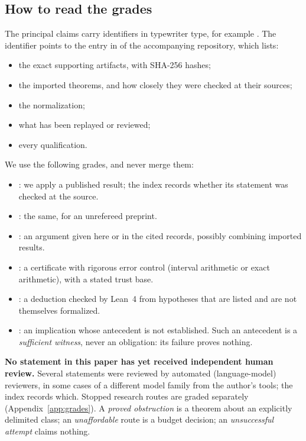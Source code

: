 \subsection{How to read the grades}\label{subsec:grades}
The principal claims carry identifiers in typewriter type, for example . The identifier points to the entry in  of the accompanying repository, which lists:
\begin{itemize}[leftmargin=*]
\item the exact supporting artifacts, with SHA-256 hashes;
\item the imported theorems, and how closely they were checked at their sources;
\item the normalization;
\item what has been replayed or reviewed;
\item every qualification.
\end{itemize}
We use the following grades, and never merge them:
\begin{itemize}[leftmargin=*]
\item {}: we apply a published result; the index records whether its statement was checked at the source.
\item {}: the same, for an unrefereed preprint.
\item {}: an argument given here or in the cited records, possibly combining imported results.
\item {}: a certificate with rigorous error control (interval arithmetic or exact arithmetic), with a stated trust base.
\item {}: a deduction checked by Lean~4 from hypotheses that are listed and are not themselves formalized.
\item {}: an implication whose antecedent is not established. Such an antecedent is a \emph{sufficient witness}, never an obligation: its failure proves nothing.
\end{itemize}

\textbf{No statement in this paper has yet received independent human review.} Several statements were reviewed by automated (language-model) reviewers, in some cases of a different model family from the author's tools; the index records which. Stopped research routes are graded separately (Appendix~\ref{app:grades}). A \emph{proved obstruction} is a theorem about an explicitly delimited class; an \emph{unaffordable} route is a budget decision; an \emph{unsuccessful attempt} claims nothing.


